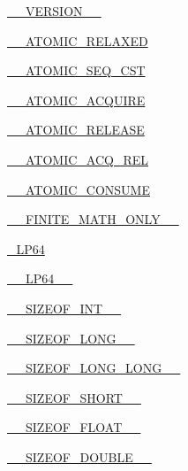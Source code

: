 \begin{DoxyCompactItemize}
\item 
\hyperlink{CMakeCache_8txt_abb4404c3387f41ca320babfbcff1102f}{\+\_\+\+\_\+\+V\+E\+R\+S\+I\+O\+N\+\_\+\+\_\+}
\item 
\hyperlink{CMakeCache_8txt_acf476ec759fbe7a6aa89427ea8965872}{\+\_\+\+\_\+\+A\+T\+O\+M\+I\+C\+\_\+\+R\+E\+L\+A\+X\+ED}
\item 
\hyperlink{CMakeCache_8txt_a44cd817264eb1136dae5f3b248f8fa8e}{\+\_\+\+\_\+\+A\+T\+O\+M\+I\+C\+\_\+\+S\+E\+Q\+\_\+\+C\+ST}
\item 
\hyperlink{CMakeCache_8txt_a77baa125558a766167c49286c9873d7f}{\+\_\+\+\_\+\+A\+T\+O\+M\+I\+C\+\_\+\+A\+C\+Q\+U\+I\+RE}
\item 
\hyperlink{CMakeCache_8txt_a5738074ef1a9257e5bcb0b527c2c93a3}{\+\_\+\+\_\+\+A\+T\+O\+M\+I\+C\+\_\+\+R\+E\+L\+E\+A\+SE}
\item 
\hyperlink{CMakeCache_8txt_a93654874cdfb30676f9c0c31eb3511c0}{\+\_\+\+\_\+\+A\+T\+O\+M\+I\+C\+\_\+\+A\+C\+Q\+\_\+\+R\+EL}
\item 
\hyperlink{CMakeCache_8txt_a000e85470c6f5d9f1aa22fa4df83f0b9}{\+\_\+\+\_\+\+A\+T\+O\+M\+I\+C\+\_\+\+C\+O\+N\+S\+U\+ME}
\item 
\hyperlink{CMakeCache_8txt_a8af0fd31855c1121674e7d0adf6acbee}{\+\_\+\+\_\+\+F\+I\+N\+I\+T\+E\+\_\+\+M\+A\+T\+H\+\_\+\+O\+N\+L\+Y\+\_\+\+\_\+}
\item 
\hyperlink{CMakeCache_8txt_aae88ee59a31703e88a326390e91a32fd}{\+\_\+\+L\+P64}
\item 
\hyperlink{CMakeCache_8txt_a2dcb516e6c55b8bdfd122dc65ada57b5}{\+\_\+\+\_\+\+L\+P64\+\_\+\+\_\+}
\item 
\hyperlink{CMakeCache_8txt_a52701f18fd19d3d5e1f83ec11c05d570}{\+\_\+\+\_\+\+S\+I\+Z\+E\+O\+F\+\_\+\+I\+N\+T\+\_\+\+\_\+}
\item 
\hyperlink{CMakeCache_8txt_a25b323872510a2d005ee2f45f5efd38b}{\+\_\+\+\_\+\+S\+I\+Z\+E\+O\+F\+\_\+\+L\+O\+N\+G\+\_\+\+\_\+}
\item 
\hyperlink{CMakeCache_8txt_a87bd59f7da0f977c3d450e95b4f00532}{\+\_\+\+\_\+\+S\+I\+Z\+E\+O\+F\+\_\+\+L\+O\+N\+G\+\_\+\+L\+O\+N\+G\+\_\+\+\_\+}
\item 
\hyperlink{CMakeCache_8txt_a13a1a9ce0eb7429c078ea705b54ac44d}{\+\_\+\+\_\+\+S\+I\+Z\+E\+O\+F\+\_\+\+S\+H\+O\+R\+T\+\_\+\+\_\+}
\item 
\hyperlink{CMakeCache_8txt_a99451faa2465beb743c5cadc6a20f102}{\+\_\+\+\_\+\+S\+I\+Z\+E\+O\+F\+\_\+\+F\+L\+O\+A\+T\+\_\+\+\_\+}
\item 
\hyperlink{CMakeCache_8txt_acb4d0f0ad8b370190fb78d60045cbe85}{\+\_\+\+\_\+\+S\+I\+Z\+E\+O\+F\+\_\+\+D\+O\+U\+B\+L\+E\+\_\+\+\_\+}

\end{DoxyCompactItemize}
